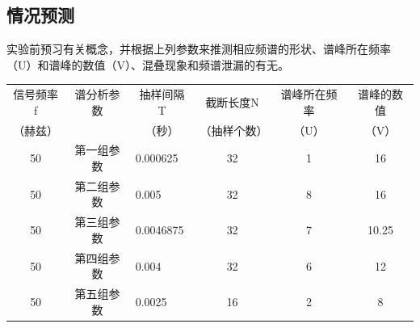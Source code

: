 \documentclass{../source/Experiment copy}
\begin{document}
        \subsection{情况预测}
            实验前预习有关概念，并根据上列参数来推测相应频谱的形状、谱峰所在频率（U）和谱峰的数值（V）、混叠现象和频谱泄漏的有无。
            \begin{table}[H]
                \centering
                \begin{tabular}{|c|c|l|c|c|c|}
                \hline
                信号频率f & 谱分析参数 & \multicolumn{1}{c|}{抽样间隔T} & 截断长度N  & 谱峰所在频率 & 谱峰的数值 \\
                （赫兹）  &       & \multicolumn{1}{c|}{（秒）}   & （抽样个数） & （U）    & （V）   \\ \hline
                50    & 第一组参数 & 0.000625                   & 32     & 1      & 16    \\ \hline
                50    & 第二组参数 & 0.005                      & 32     & 8      & 16    \\ \hline
                50    & 第三组参数 & 0.0046875                  & 32     & 7      & 10.25 \\ \hline
                50    & 第四组参数 & 0.004                      & 32     & 6      & 12    \\ \hline
                50    & 第五组参数 & 0.0025                     & 16     & 2      & 8     \\ \hline
                \end{tabular}
            \end{table}
            
\end{document}
